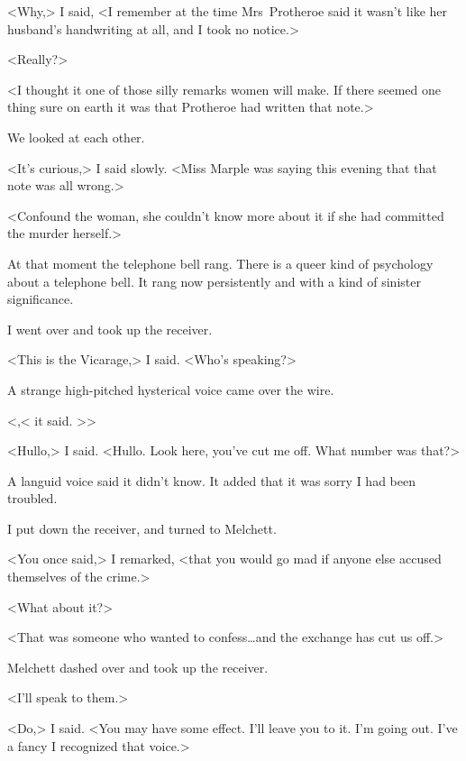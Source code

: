 <Why,> I said, <I remember at the time Mrs~Protheroe said it wasn't like her husband's handwriting at all, and I took no notice.>

<Really?>

<I thought it one of those silly remarks women will make. If there seemed one thing sure on earth it was that Protheroe had written that note.>

We looked at each other.

<It's curious,> I said slowly. <Miss Marple was saying this evening that that note was all wrong.>

<Confound the woman, she couldn't know more about it if she had committed the murder herself.>

At that moment the telephone bell rang. There is a queer kind of psychology about a telephone bell. It rang now persistently and with a kind of sinister significance.

I went over and took up the receiver.

<This is the Vicarage,> I said. <Who's speaking?>

A strange high-pitched hysterical voice came over the wire.

<,< it said. >>

<Hullo,> I said. <Hullo. Look here, you've cut me off. What number was that?>

A languid voice said it didn't know. It added that it was sorry I had been troubled.

I put down the receiver, and turned to Melchett.

<You once said,> I remarked, <that you would go mad if anyone else accused themselves of the crime.>

<What about it?>

<That was someone who wanted to confess\dots and the exchange has cut us off.>

Melchett dashed over and took up the receiver.

<I'll speak to them.>

<Do,> I said. <You may have some effect. I'll leave you to it. I'm going out. I've a fancy I recognized that voice.>